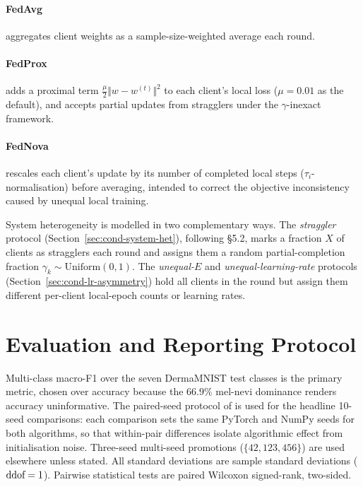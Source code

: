 \documentclass[11pt,a4paper]{report}
\begin{document}
\paragraph{FedAvg \citep{mcmahan2017fedavg}} aggregates client weights as a
sample-size-weighted average each round.

\paragraph{FedProx \citep{li2020fedprox}} adds a proximal term
$\frac{\mu}{2}\Vert w - w^{(t)} \Vert^2$ to each client's local loss
($\mu = 0.01$ as the default), and accepts partial updates from stragglers
under the $\gamma$-inexact framework.

\paragraph{FedNova \citep{wang2020fednova}} rescales each client's update by
its number of completed local steps ($\tau_i$-normalisation) before averaging,
intended to correct the objective inconsistency caused by unequal local
training.

System heterogeneity is modelled in two complementary ways. The
\emph{straggler} protocol (Section~\ref{sec:cond-system-het}), following
\citet{li2020fedprox} §5.2, marks a fraction $X$ of clients as stragglers each
round and assigns them a random partial-completion fraction
$\gamma_k \sim \mathrm{Uniform}(0, 1)$. The \emph{unequal-$E$} and
\emph{unequal-learning-rate} protocols
(Section~\ref{sec:cond-lr-asymmetry}) hold all clients in the round but assign
them different per-client local-epoch counts or learning rates.

\section{Evaluation and Reporting Protocol}
\label{sec:cond-evaluation}

Multi-class macro-F1 over the seven DermaMNIST test classes is the primary
metric, chosen over accuracy because the $66.9\%$ mel-nevi dominance renders
accuracy uninformative. The paired-seed protocol of \citet{li2020fedprox} is
used for the headline 10-seed comparisons: each comparison sets the same
PyTorch and NumPy seeds for both algorithms, so that within-pair differences
isolate algorithmic effect from initialisation noise. Three-seed
multi-seed promotions ($\{42, 123, 456\}$) are used elsewhere unless
stated. All standard deviations are sample standard deviations
($\textnormal{ddof} = 1$). Pairwise statistical tests are paired Wilcoxon
signed-rank, two-sided.
\end{document}
